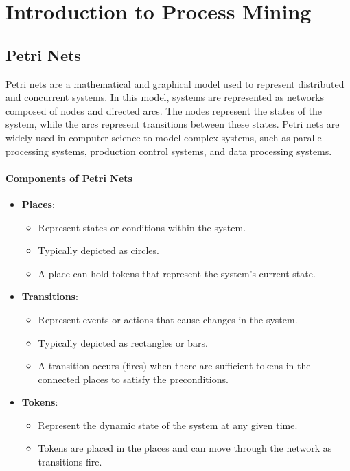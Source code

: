 \section{Introduction to Process Mining}

\subsection{Petri Nets}

Petri nets are a mathematical and graphical model used to represent distributed and concurrent systems. In this model, systems are represented as networks composed of nodes and directed arcs. The nodes represent the states of the system, while the arcs represent transitions between these states. Petri nets are widely used in computer science to model complex systems, such as parallel processing systems, production control systems, and data processing systems.

\paragraph{Components of Petri Nets}
\begin{itemize}
    \item \textbf{Places}:
    \begin{itemize}
        \item Represent states or conditions within the system.
        \item Typically depicted as circles.
        \item A place can hold tokens that represent the system's current state.
    \end{itemize}
    \item \textbf{Transitions}:
    \begin{itemize}
        \item Represent events or actions that cause changes in the system.
        \item Typically depicted as rectangles or bars.
        \item A transition occurs (fires) when there are sufficient tokens in the connected places to satisfy the preconditions.
    \end{itemize}
    \item \textbf{Tokens}:
    \begin{itemize}
        \item Represent the dynamic state of the system at any given time.
        \item Tokens are placed in the places and can move through the network as transitions fire.
    \end{itemize}
\end{itemize}


